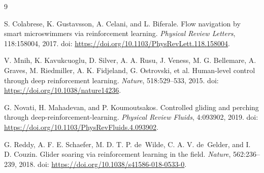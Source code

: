\documentclass{article}
\begin{document}
\begin{thebibliography}{9}

S. Colabrese, K. Gustavsson, A. Celani, and L. Biferale.
Flow navigation by smart microswimmers via reinforcement learning.
\emph{Physical Review Letters}, 118:158004, 2017.
doi: \url{https://doi.org/10.1103/PhysRevLett.118.158004}.

V. Mnih, K. Kavukcuoglu, D. Silver, A. A. Rusu, J. Veness, M. G. Bellemare,
A. Graves, M. Riedmiller, A. K. Fidjeland, G. Ostrovski, et al.
Human-level control through deep reinforcement learning.
\emph{Nature}, 518:529--533, 2015.
doi: \url{https://doi.org/10.1038/nature14236}.

G. Novati, H. Mahadevan, and P. Koumoutsakos.
Controlled gliding and perching through deep-reinforcement-learning.
\emph{Physical Review Fluids}, 4:093902, 2019.
doi: \url{https://doi.org/10.1103/PhysRevFluids.4.093902}.

G. Reddy, A. F. E. Schaefer, M. D. T. P. de~Wilde, C. A. V. de~Gelder,
and I. D. Couzin.
Glider soaring via reinforcement learning in the field.
\emph{Nature}, 562:236--239, 2018.
doi: \url{https://doi.org/10.1038/s41586-018-0533-0}.

\end{thebibliography}
\end{document}

